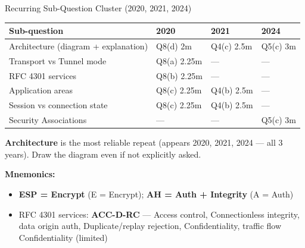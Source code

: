 \documentclass[12pt,a4paper]{article}
\begin{document}
\begin{keybox}{Recurring Sub-Question Cluster (2020, 2021, 2024)}
\begin{tabular}{@{}llll@{}}
\toprule
\textbf{Sub-question} & \textbf{2020} & \textbf{2021} & \textbf{2024} \\
\midrule
Architecture (diagram + explanation) & Q8(d) 2m & Q4(c) 2.5m & Q5(c) 3m \\
Transport vs Tunnel mode & Q8(a) 2.25m & --- & --- \\
RFC 4301 services & Q8(b) 2.25m & --- & --- \\
Application areas & Q8(c) 2.25m & Q4(b) 2.5m & --- \\
Session vs connection state & Q8(c) 2.25m & Q4(b) 2.5m & --- \\
Security Associations & --- & --- & Q5(c) 3m \\
\bottomrule
\end{tabular}

\medskip
\textbf{Architecture} is the most reliable repeat (appears 2020, 2021, 2024 --- all 3 years). Draw the diagram even if not explicitly asked.

\medskip
\textbf{Mnemonics:}
\begin{itemize}[nosep]
  \item \textbf{ESP = Encrypt} (E = Encrypt); \textbf{AH = Auth + Integrity} (A = Auth)
  \item RFC 4301 services: \textbf{ACC-D-RC} --- Access control, Connectionless integrity, data origin auth, Duplicate/replay rejection, Confidentiality, traffic flow Confidentiality (limited)
\end{itemize}
\end{keybox}
\end{document}
